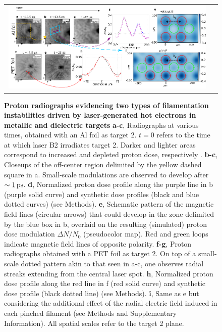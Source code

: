 \documentclass[aps,twocolumn,showpacs,superscriptaddress]{revtex4}
\begin{document}
\begin{figure}[tbh!]
\begin{tabular}{cc}
\includegraphics[width=0.99\textwidth]{panel_v7_woE2.png}
\end{tabular}
 \caption{
\textbf{Proton radiographs evidencing two types of filamentation instabilities driven by laser-generated hot electrons in metallic and dielectric targets}
\textbf{a-c}, Radiographs at various times, obtained with an Al foil as target 2. $t=0$ refers to the time at which laser B2 irradiates target 2. Darker and lighter areas correspond to increased and depleted proton dose, respectively \cite{RSI_Albertazzi_2015}. 
\textbf{b-c}, Closeups of the off-center region delimited by the yellow dashed square in a. Small-scale modulations are observed to develop after $\sim 1\,\rm ps$.
\textbf{d}, Normalized proton dose profile along the purple line in b (purple solid curve) and synthetic dose profiles (black and blue dotted curves) (see Methods).
\textbf{e}, Schematic pattern of the magnetic field lines (circular arrows) that could develop in the zone delimited by the blue box in b, overlaid on the resulting (simulated) proton dose modulation $\Delta N/N_0$ (pseudocolor map). Red and green loops indicate magnetic field lines of opposite polarity.
\textbf{f-g}, Proton radiographs obtained with a PET foil as target 2. On top of a small-scale dotted pattern akin to that seen in a-c, one observes radial streaks extending from the central laser spot. 
\textbf{h}, Normalized proton dose profile along the red line in f (red solid curve) and synthetic dose profile (black dotted line) (see Methods).
\textbf{i}, Same as e but considering the additional effect of the radial electric field induced in each pinched filament (see Methods and Supplementary Information).
All spatial scales refer to the target 2 plane.}
\label{fig:radio}
\end{figure}
\end{document}
